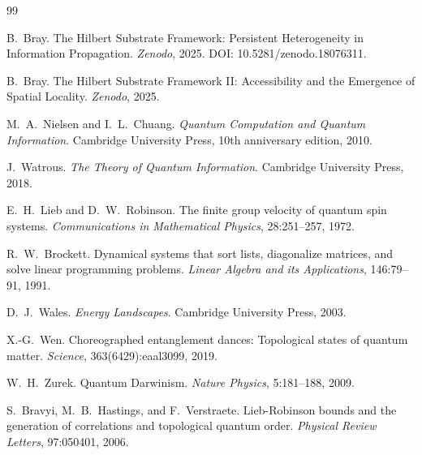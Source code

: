 \documentclass[11pt]{article}
\begin{document}

\begin{thebibliography}{99}

B.~Bray.
\newblock The Hilbert Substrate Framework: Persistent Heterogeneity in Information Propagation.
\newblock \emph{Zenodo}, 2025.
\newblock DOI: 10.5281/zenodo.18076311.

B.~Bray.
\newblock The Hilbert Substrate Framework II: Accessibility and the Emergence of Spatial Locality.
\newblock \emph{Zenodo}, 2025.

M.~A.~Nielsen and I.~L.~Chuang.
\newblock \emph{Quantum Computation and Quantum Information}.
\newblock Cambridge University Press, 10th anniversary edition, 2010.

J.~Watrous.
\newblock \emph{The Theory of Quantum Information}.
\newblock Cambridge University Press, 2018.

E.~H.~Lieb and D.~W.~Robinson.
\newblock The finite group velocity of quantum spin systems.
\newblock \emph{Communications in Mathematical Physics}, 28:251--257, 1972.

R.~W.~Brockett.
\newblock Dynamical systems that sort lists, diagonalize matrices, and solve linear programming problems.
\newblock \emph{Linear Algebra and its Applications}, 146:79--91, 1991.

D.~J.~Wales.
\newblock \emph{Energy Landscapes}.
\newblock Cambridge University Press, 2003.

X.-G.~Wen.
\newblock Choreographed entanglement dances: Topological states of quantum matter.
\newblock \emph{Science}, 363(6429):eaal3099, 2019.

W.~H.~Zurek.
\newblock Quantum Darwinism.
\newblock \emph{Nature Physics}, 5:181--188, 2009.

S.~Bravyi, M.~B.~Hastings, and F.~Verstraete.
\newblock Lieb-Robinson bounds and the generation of correlations and topological quantum order.
\newblock \emph{Physical Review Letters}, 97:050401, 2006.

\end{thebibliography}
\end{document}
